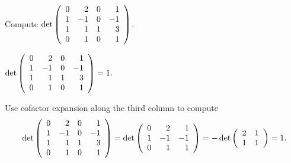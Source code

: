 \documentclass{ximera}
\author{Matthew Carr}
\begin{document}

\begin{exercise}\label{mc7_1A}

Compute \quad $\det\left(\begin{array}{rrrrrrrrrrrrrrrrrr} 0 & 2 & 0 & 1\\ 1 & -1 & 0 & -1\\ 1 & 1 & 1& 3\\ 0 & 1 & 0 & 1 \end{array}\right)$.
  
\begin{solution}

\ans $\det\left(\begin{array}{rrrrrrrrrrrrrrrrrr} 0 & 2 & 0 & 1\\ 1 & -1 & 0 & -1\\ 1 & 1 & 1& 3\\ 0 & 1 & 0 & 1 \end{array}\right)=1\ldotp$

\soln Use cofactor expansion along the third column to compute
\[
\det\left(\begin{array}{rrrrrrrrrrrrrrrrrr} 0 & 2 & 0 & 1\\ 1 & -1 & 0 & -1\\ 1 & 1 & 1& 3\\ 0 & 1 & 0 & 1 \end{array}\right) = 
\det\left(\begin{array}{rrrrrrrrrrrrrrrrrr} 0 & 2 & 1\\ 1 & -1 &  -1\\  0& 1 & 1 \end{array}\right) = -\det\left(\begin{array}{rrrrrrrrrrrrrrrrrr} 2 & 1\\ 1 & 1 \end{array}\right) = 1\ldotp
\]
\end{solution}
\end{exercise}
\end{document}
